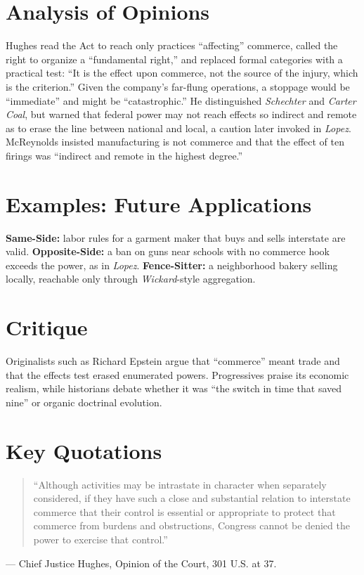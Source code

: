 \documentclass[12pt]{article}
\begin{document}
\section{Analysis of Opinions}
Hughes read the Act to reach only practices ``affecting'' commerce, called the right to organize a ``fundamental right,'' and replaced formal categories with a practical test: ``It is the effect upon commerce, not the source of the injury, which is the criterion.'' Given the company's far-flung operations, a stoppage would be ``immediate'' and might be ``catastrophic.'' He distinguished \textit{Schechter} and \textit{Carter Coal}, but warned that federal power may not reach effects so indirect and remote as to erase the line between national and local, a caution later invoked in \textit{Lopez}. McReynolds insisted manufacturing is not commerce and that the effect of ten firings was ``indirect and remote in the highest degree.''

\section{Examples: Future Applications}
\textbf{Same-Side:} labor rules for a garment maker that buys and sells interstate are valid. \textbf{Opposite-Side:} a ban on guns near schools with no commerce hook exceeds the power, as in \textit{Lopez}. \textbf{Fence-Sitter:} a neighborhood bakery selling locally, reachable only through \textit{Wickard}-style aggregation.

\section{Critique}
Originalists such as Richard Epstein argue that ``commerce'' meant trade and that the effects test erased enumerated powers. Progressives praise its economic realism, while historians debate whether it was ``the switch in time that saved nine'' or organic doctrinal evolution.

\section{Key Quotations}
\begin{quote}
``Although activities may be intrastate in character when separately considered, if they have such a close and substantial relation to interstate commerce that their control is essential or appropriate to protect that commerce from burdens and obstructions, Congress cannot be denied the power to exercise that control.''
\end{quote}
\noindent --- Chief Justice Hughes, Opinion of the Court, 301 U.S. at 37.
\end{document}
